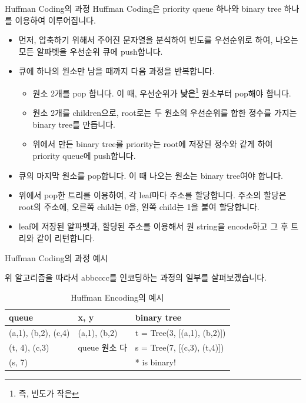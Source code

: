 \documentclass{beamer}
\begin{document}
 
\begin{frame}{Huffman Coding의 과정 }
 Huffman Coding은 priority queue 하나와 binary tree 하나를 이용하여 이루어집니다. 
\begin{itemize}
\item 먼저, 압축하기 위해서 주어진 문자열을 분석하여 빈도를 우선순위로 하여, 나오는 모든 알파벳을 우선순위 큐에 push합니다. 
\item 큐에 하나의 원소만 남을 때까지 다음 과정을 반복합니다. 
\begin{itemize} 
\item 원소 2개를 pop 합니다. 이 때, 우선순위가 \textbf{낮은}\footnote{즉, 빈도가 작은} 원소부터 pop해야 합니다. 
\item 원소 2개를 children으로, root로는 두 원소의 우선순위를 합한 정수를 가지는 binary tree를 만듭니다. 
\item 위에서 만든 binary tree를 priority는 root에 저장된 정수와 같게 하여 priority queue에 push합니다.  
\end{itemize}
\item 큐의 마지막 원소를 pop합니다. 이 때 나오는 원소는 binary tree여야 합니다. 
\item 위에서 pop한 트리를 이용하여, 각 leaf마다 주소를 할당합니다. 주소의 할당은 root의 주소에, 오른쪽 child는 0을, 왼쪽 child는 1을 붙여 할당합니다. 
\item leaf에 저장된 알파벳과, 할당된 주소를 이용해서 원 string을 encode하고 그 후 트리와 같이 리턴합니다. 
\end{itemize}
 \end{frame} 
 
 \begin{frame}{Huffman Coding의 과정 예시}
 
 위 알고리즘을 따라서 abbcccc를 인코딩하는 과정의 일부를 살펴보겠습니다. 
\begin{table}[]
\centering
\caption{Huffman Encoding의 예시}
\label{my-label}
\begin{tabular}{|l|l|l|}
\hline
queue & x, y & binary tree \\ \hline
(a,1), (b,2), (c,4) & (a,1), (b,2)    & t = Tree(3, [(a,1), (b,2)])     \\ \hline
(t, 4), (c,3) & queue 원소 다   & s = Tree(7, [(c,3), (t,4)])      \\ \hline
(s, 7) &     & * is binary!      \\ \hline
\end{tabular}
\end{table}

 \end{frame}
\end{document}
